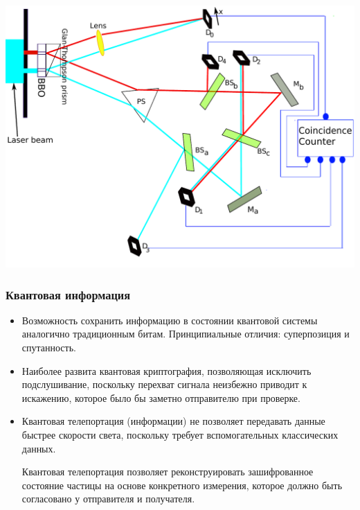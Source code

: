 \documentclass[10pt]{beamer}
\begin{document}
\begin{frame}[label=EPR-Copenhagen-support]
  \includegraphics[height=\localheight]{figures/quantum-eraser-nonclassical}
\end{frame}%

\begin{frame}[label=quantum-information]%
  \frametitle{Квантовая информация}

  \begin{itemize}
    \item Возможность сохранить информацию в состоянии квантовой системы 
      аналогично традиционным битам. Принципиальные отличия: 
      суперпозиция и спутанность.
    \item Наиболее развита квантовая криптография, позволяющая исключить 
      подслушивание, поскольку перехват сигнала неизбежно приводит 
      к искажению, которое было бы заметно отправителю при проверке.
    \item Квантовая телепортация (информации) не позволяет передавать 
      данные быстрее скорости света, поскольку требует вспомогательных 
      классических данных.

      Квантовая телепортация позволяет реконструировать зашифрованное 
      состояние частицы на основе конкретного измерения, которое должно 
      быть согласовано у отправителя и получателя.
  \end{itemize}
\end{frame}%
\end{document}
